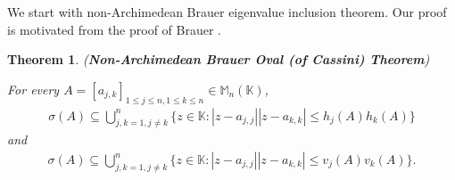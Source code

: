 \documentclass{amsart}
\newtheorem{theorem}{Theorem}[section]
\begin{document}
We start with non-Archimedean Brauer eigenvalue inclusion theorem. Our proof is motivated from the proof of Brauer \cite{BRAUER}.
\begin{theorem}  \label{NAB} (\textbf{Non-Archimedean Brauer Oval (of Cassini) Theorem})

For every $A=[a_{j,k}]_{1\leq j\leq n, 1\leq k \leq n}\in  \mathbb{M}_n(\mathbb{K})$,
\begin{align*}
	\sigma(A)\subseteq \bigcup_{j,k=1, j \neq k}^n\{z \in \mathbb{K}: |z-a_{j, j}||z-a_{k,k}|\leq h_j(A)h_k(A)\}
\end{align*}
and 
\begin{align*}
	\sigma(A)\subseteq \bigcup_{j,k=1, j \neq k}^n\{z \in \mathbb{K}: |z-a_{j, j}||z-a_{k,k}|\leq v_j(A)v_k(A)\}.
\end{align*}	
\end{theorem}
\end{document}
